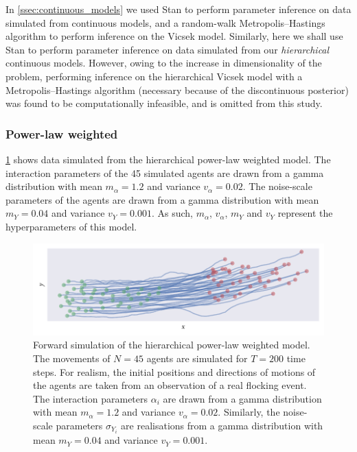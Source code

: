 In \cref{ssec:continuous_models} we used Stan to perform parameter inference on
data simulated from continuous models, and a random-walk Metropolis--Hastings
algorithm to perform inference on the Vicsek model. Similarly, here we shall
use Stan to perform parameter inference on data simulated from our
\emph{hierarchical} continuous models. However, owing to the increase in
dimensionality of the problem, performing inference on the hierarchical Vicsek
model with a Metropolis--Hastings algorithm (necessary because of the
discontinuous posterior) was found to be computationally infeasible, and is
omitted from this study.

\subsubsection{Power-law weighted}

\cref{fig:power_hier_sim} shows data simulated from the hierarchical power-law
weighted model. The interaction parameters of the 45 simulated agents are
drawn from a gamma distribution with mean $m_{\alpha}=1.2$ and variance
$v_{\alpha}=0.02$. The noise-scale parameters of the agents are drawn from a
gamma distribution with mean $m_Y=0.04$ and variance $v_Y=0.001$. As such,
$m_{\alpha}$, $v_{\alpha}$, $m_Y$ and $v_Y$ represent the hyperparameters of
this model.

\begin{figure}[tbp]
  \includegraphics{power/power_hier_sim.pdf}
  \caption{Forward simulation of the hierarchical power-law weighted model. The
    movements of $N=45$ agents are simulated for $T=200$ time steps. For
    realism, the initial positions and directions of motions of the agents
    are taken from an observation of a real flocking event. The interaction
    parameters $\alpha_i$ are drawn from a gamma distribution with mean
    $m_{\alpha}=1.2$ and variance $v_{\alpha}=0.02$. Similarly, the
    noise-scale parameters $\sigma_{Y_i}$ are realisations from a gamma
    distribution with mean $m_Y=0.04$ and variance $v_Y=0.001$.}
  \label{fig:power_hier_sim}
\end{figure}

